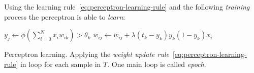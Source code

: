 Using the learning rule~\ref{eq:perceptron-learning-rule} and the following \emph{training} process the perceptron is able to \emph{learn}: 
\begin{algorithm}[H]
  \begin{algorithmic}
        \State $y_j \gets \phi(\sum_{i=0}^N x_iw_{ik}) > \theta_k$
          \State $w_{ij} \gets w_{ij} + \lambda (t_k - y_k)y_k(1 - y_k)x_i$
        \EndFor
      \EndFor
    \EndFor
  \end{algorithmic}
  \caption{Perceptron learning. Applying the \emph{weight update rule}~\ref{eq:perceptron-learning-rule} in loop for each sample in $T$. One main loop is called \emph{epoch}.}  
  \label{alg:perceptron-learning}
\end{algorithm} 

